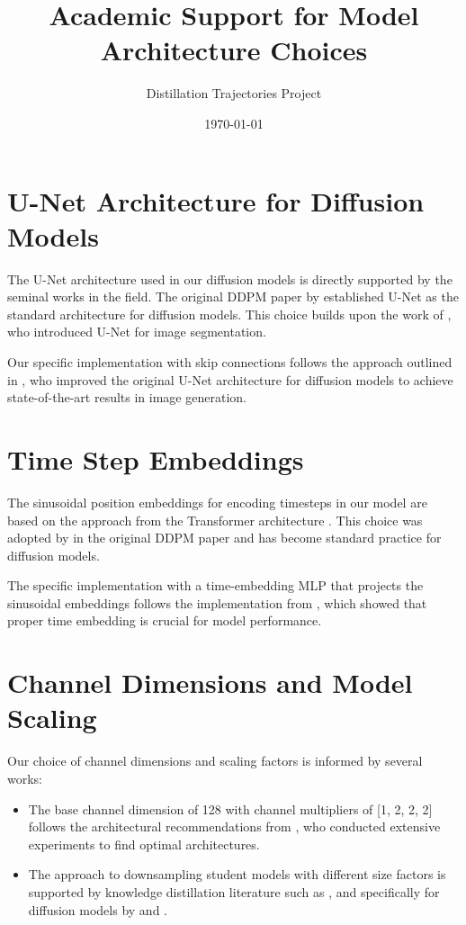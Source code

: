 \documentclass{article}
\title{Academic Support for Model Architecture Choices}
\author{Distillation Trajectories Project}
\date{\today}
\begin{document}
\maketitle

\section{U-Net Architecture for Diffusion Models}

The U-Net architecture used in our diffusion models is directly supported by the seminal works in the field. The original DDPM paper by \citet{ho2020denoising} established U-Net as the standard architecture for diffusion models. This choice builds upon the work of \citet{ronneberger2015unet}, who introduced U-Net for image segmentation.

Our specific implementation with skip connections follows the approach outlined in \citet{dhariwal2021diffusion}, who improved the original U-Net architecture for diffusion models to achieve state-of-the-art results in image generation.

\section{Time Step Embeddings}

The sinusoidal position embeddings for encoding timesteps in our model are based on the approach from the Transformer architecture \citep{vaswani2017attention}. This choice was adopted by \citet{ho2020denoising} in the original DDPM paper and has become standard practice for diffusion models.

The specific implementation with a time-embedding MLP that projects the sinusoidal embeddings follows the implementation from \citet{nichol2021improved}, which showed that proper time embedding is crucial for model performance.

\section{Channel Dimensions and Model Scaling}

Our choice of channel dimensions and scaling factors is informed by several works:

\begin{itemize}
    \item The base channel dimension of 128 with channel multipliers of [1, 2, 2, 2] follows the architectural recommendations from \citet{dhariwal2021diffusion}, who conducted extensive experiments to find optimal architectures.
    
    \item The approach to downsampling student models with different size factors is supported by knowledge distillation literature such as \citet{hinton2015distilling}, and specifically for diffusion models by \citet{luhman2021knowledge} and \citet{salimans2022progressive}.
\end{itemize}
\end{document}
